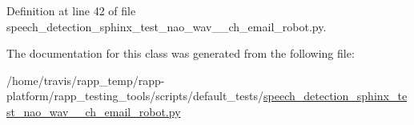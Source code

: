 Definition at line 42 of file speech\-\_\-detection\-\_\-sphinx\-\_\-test\-\_\-nao\-\_\-wav\-\_\-\_\-ch\-\_\-email\-\_\-robot.\-py.



The documentation for this class was generated from the following file\-:\begin{DoxyCompactItemize}
\item 
/home/travis/rapp\-\_\-temp/rapp-\/platform/rapp\-\_\-testing\-\_\-tools/scripts/default\-\_\-tests/\hyperlink{speech__detection__sphinx__test__nao__wav__1__ch__email__robot_8py}{speech\-\_\-detection\-\_\-sphinx\-\_\-test\-\_\-nao\-\_\-wav\-\_\-\_\-ch\-\_\-email\-\_\-robot.\-py}\end{DoxyCompactItemize}
